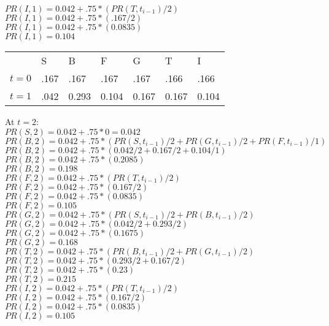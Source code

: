 \documentclass{article}
\begin{document}
\noindent
$PR(I, 1) = 0.042 + .75*(PR(T,t_{i-1})/2)$ \\
$PR(I, 1) = 0.042 + .75*(.167/2)$ \\
$PR(I, 1) = 0.042 + .75*(0.0835)$ \\
$PR(I, 1) = 0.104$ \\

\begin{table}[h!]
	\begin{tabular}{lllllll}
		      & S    & B     & F     & G     & T     & I     \\
		$t=0$ & .167 & .167  & .167  & .167  & .166  & .166  \\
		$t=1$ & .042 & 0.293 & 0.104 & 0.167 & 0.167 & 0.104    
	\end{tabular}
\end{table}

\noindent
At $t=2$: \\
$PR(S, 2) = 0.042 + .75*0 = 0.042$\\

\noindent
$PR(B, 2) = 0.042 + .75*(PR(S,t_{i-1})/2 + PR(G,t_{i-1})/2 + PR(F, t_{i-1})/1)$ \\
$PR(B, 2) = 0.042 + .75*(0.042/2 + 0.167/2 + 0.104/1)$ \\
$PR(B, 2) = 0.042 + .75*(0.2085)$ \\
$PR(B, 2) = 0.198$ \\

\noindent
$PR(F, 2) = 0.042 + .75*(PR(T,t_{i-1})/2)$ \\
$PR(F, 2) = 0.042 + .75*(0.167/2)$ \\
$PR(F, 2) = 0.042 + .75*(0.0835)$ \\
$PR(F, 2) = 0.105$ \\

\noindent
$PR(G, 2) = 0.042 + .75*(PR(S,t_{i-1})/2 + PR(B,t_{i-1})/2)$ \\
$PR(G, 2) = 0.042 + .75*(0.042/2 + 0.293/2)$ \\
$PR(G, 2) = 0.042 + .75*(0.1675)$ \\
$PR(G, 2) = 0.168$ \\

\noindent
$PR(T, 2) = 0.042 + .75*(PR(B,t_{i-1})/2 + PR(G,t_{i-1})/2)$ \\
$PR(T, 2) = 0.042 + .75*(0.293/2 + 0.167/2)$ \\
$PR(T, 2) = 0.042 + .75*(0.23)$ \\
$PR(T, 2) = 0.215$ \\

\noindent
$PR(I, 2) = 0.042 + .75*(PR(T,t_{i-1})/2)$ \\
$PR(I, 2) = 0.042 + .75*(0.167/2)$ \\
$PR(I, 2) = 0.042 + .75*(0.0835)$ \\
$PR(I, 2) = 0.105$ \\
\end{document}
